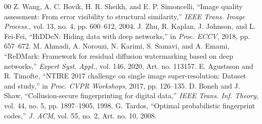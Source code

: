 \documentclass[conference]{IEEEtran}
\begin{document}
\begin{thebibliography}{00}
 Z. Wang, A. C. Bovik, H. R. Sheikh, and E. P. Simoncelli, ``Image quality assessment: From error visibility to structural similarity,'' \emph{IEEE Trans. Image Process.}, vol. 13, no. 4, pp. 600--612, 2004.
 J. Zhu, R. Kaplan, J. Johnson, and L. Fei-Fei, ``HiDDeN: Hiding data with deep networks,'' in \emph{Proc. ECCV}, 2018, pp. 657--672.
 M. Ahmadi, A. Norouzi, N. Karimi, S. Samavi, and A. Emami, ``ReDMark: Framework for residual diffusion watermarking based on deep networks,'' \emph{Expert Syst. Appl.}, vol. 146, 2020, Art. no. 113157.
 E. Agustsson and R. Timofte, ``NTIRE 2017 challenge on single image super-resolution: Dataset and study,'' in \emph{Proc. CVPR Workshops}, 2017, pp. 126--135.
 D. Boneh and J. Shaw, ``Collusion-secure fingerprinting for digital data,'' \emph{IEEE Trans. Inf. Theory}, vol. 44, no. 5, pp. 1897--1905, 1998.
 G. Tardos, ``Optimal probabilistic fingerprint codes,'' \emph{J. ACM}, vol. 55, no. 2, Art. no. 10, 2008.
\end{thebibliography}
\end{document}
